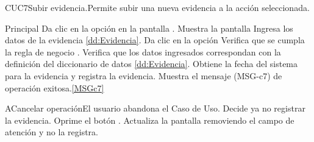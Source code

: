 
	\begin{UseCase}{CUC7}{Subir evidencia.}{Permite subir una nueva evidencia a la acción seleccionada.}
	\end{UseCase}
		
	\begin{UCtrayectoria}{Principal}
		\UCpaso[\UCactor] Da clic en la opción  en la pantalla .
		\UCpaso Muestra la pantalla 
		\UCpaso [\UCactor] Ingresa los datos de la evidencia \ref{dd:Evidencia}.
		\UCpaso [\UCactor] Da clic en la opción 
		\UCpaso Verifica que se cumpla la regla de negocio . 
		\UCpaso Verifica que los datos ingresados correspondan  con la definición del diccionario de datos \ref{dd:Evidencia}. 
		\UCpaso Obtiene la fecha del sistema para la evidencia y registra la evidencia.
		\UCpaso Muestra el mensaje (MSG-c7) de operación exitosa.\ref{MSGc7}
		\
	\end{UCtrayectoria}
		
	\begin{UCtrayectoriaA}{A}{Cancelar operación}{El usuario abandona el Caso de Uso.}
			\UCpaso[\UCactor] Decide ya no registrar la evidencia.
			\UCpaso[\UCactor] Oprime el botón .
			\UCpaso Actualiza la pantalla removiendo el campo de atención y no la registra.
	\end{UCtrayectoriaA}
